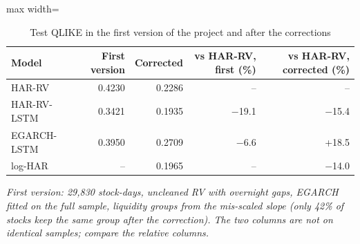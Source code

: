 \begin{table}[htbp]
\centering
\caption{Test QLIKE in the first version of the project and after the corrections}
\label{tab:versions}
\small
\begin{adjustbox}{max width=\textwidth}
\begin{tabular}{lrrrr}
\toprule
Model & First version & Corrected & vs HAR-RV, first (\%) & vs HAR-RV, corrected (\%) \\
\midrule
HAR-RV & 0.4230 & 0.2286 & -- & -- \\
HAR-RV-LSTM & 0.3421 & 0.1935 & $-$19.1 & $-$15.4 \\
EGARCH-LSTM & 0.3950 & 0.2709 & $-$6.6 & +18.5 \\
log-HAR & -- & 0.1965 & -- & $-$14.0 \\
\bottomrule
\end{tabular}
\end{adjustbox}
\par\smallskip\parbox{0.95\textwidth}{\footnotesize\itshape First version: 29,830 stock-days, uncleaned RV with overnight gaps, EGARCH fitted on the full sample, liquidity groups from the mis-scaled slope (only 42\% of stocks keep the same group after the correction). The two columns are not on identical samples; compare the relative columns.}
\end{table}
